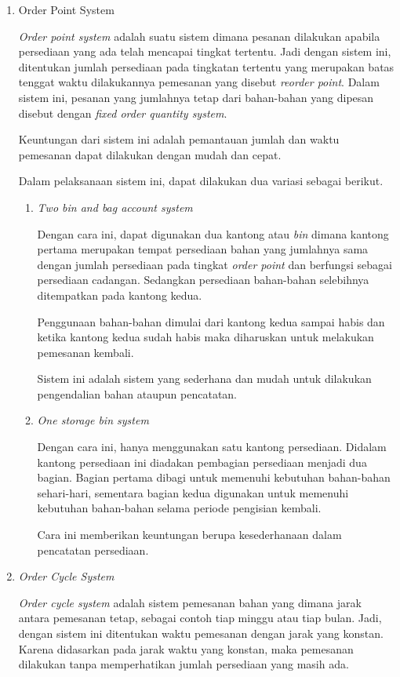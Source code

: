 \begin{enumerate}
	\item Order Point System
	

	\textit{Order point system} adalah suatu sistem dimana pesanan dilakukan apabila persediaan yang ada telah mencapai tingkat tertentu. Jadi dengan sistem ini, ditentukan jumlah persediaan pada tingkatan tertentu yang merupakan batas tenggat waktu dilakukannya pemesanan yang disebut \textit{reorder point}. Dalam sistem ini, pesanan yang jumlahnya tetap dari bahan-bahan yang dipesan disebut dengan \textit{fixed order quantity system}. 

	Keuntungan dari sistem ini adalah pemantauan jumlah dan waktu pemesanan dapat dilakukan dengan mudah dan cepat.

	Dalam pelaksanaan sistem ini, dapat dilakukan dua variasi sebagai berikut.

	\begin{enumerate}
		\item \textit{Two bin and bag account system}
		
		Dengan cara ini, dapat digunakan dua kantong atau \textit{bin} dimana kantong pertama merupakan tempat persediaan bahan yang jumlahnya sama dengan jumlah persediaan pada tingkat \textit{order point} dan berfungsi sebagai persediaan cadangan. Sedangkan persediaan bahan-bahan selebihnya ditempatkan pada kantong kedua.

		Penggunaan bahan-bahan dimulai dari kantong kedua sampai habis dan ketika kantong kedua sudah habis maka diharuskan untuk melakukan pemesanan kembali.

		Sistem ini adalah sistem yang sederhana dan mudah untuk dilakukan pengendalian bahan ataupun pencatatan.

		\item \textit{One storage bin system}
		
		Dengan cara ini, hanya menggunakan satu kantong persediaan. Didalam kantong persediaan ini diadakan pembagian persediaan menjadi dua bagian. Bagian pertama dibagi untuk memenuhi kebutuhan bahan-bahan sehari-hari, sementara bagian kedua digunakan untuk memenuhi kebutuhan bahan-bahan selama periode pengisian kembali.

		Cara ini memberikan keuntungan berupa kesederhanaan dalam pencatatan persediaan.
	\end{enumerate}

	\item \textit{Order Cycle System}
	
	\textit{Order cycle system} adalah sistem pemesanan bahan yang dimana jarak antara pemesanan tetap, sebagai contoh tiap minggu atau tiap bulan. Jadi, dengan sistem ini ditentukan waktu pemesanan dengan jarak yang konstan. Karena didasarkan pada jarak waktu yang konstan, maka pemesanan dilakukan tanpa memperhatikan jumlah persediaan yang masih ada.


\end{enumerate}
